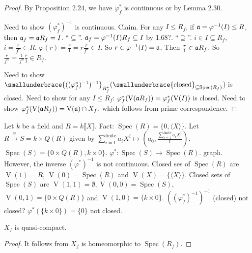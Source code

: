 \begin{proof}
    By Proposition 2.24, we have $\varphi_f^*$ is continuous or by Lemma 2.30. \par 
    Need to show $(\varphi_f^*)^{-1}$ is continuous. Claim. For any $I \leq R_f$, if $\mathfrak{a} = \varphi^{-1}(I) \leq R$, then $\mathfrak{a}_f = \mathfrak{a} R_f = I$. ``$\subseteq$''. $\mathfrak{a}_f = \varphi^{-1}(I)R_f \subseteq I$ by 1.68?. ``$\supseteq$''. $i \in I \subseteq R_f$, $i = \frac{r}{f^n} \in R$. $\varphi(r) = \frac{r}{1} = r\frac{r}{f^n} \in I $. So $r \in \varphi^{-1}(I) = \mathfrak{a}$. Then $\frac{r}{1} \in \mathfrak{a} R_f$. So $\frac{r}{f^n} = \frac{1}{f^n} \frac{r}{1} \in R_f$. \par 
    Need to show $\smallunderbrace{((\varphi_f^*)^{-1})^{-1}}_{R_f^*}(\smallunderbrace{\text{closed}}_{\subseteq \operatorname{Spec}(R_f)}$) is closed. Need to show for any $I \leq R_f$: $\varphi_f^*(\operatorname{V}(\mathfrak{a} R_f)) = \varphi_f^*(\operatorname{V}(I))$ is closed. Need to show $\varphi_f^*(\operatorname{V}(\mathfrak{a} R_f)) = \operatorname{V}(\mathfrak{a}) \cap X_f$, which follows from prime correspondence.
\end{proof}

\begin{example}
    Let $k$ be a field and $R = k\llbracket X \rrbracket$. Fact: $\operatorname{Spec}(R) = \{0,\langle X \rangle\}$. Let $R \xrightarrow \varphi S = k \times Q(R)$ given by $\sum_{i=1}^{\text{finite}} a_iX^i \mapsto (a_0,\frac{\sum_{i=1}^{\text{finite}} a_iX^i}{1})$. $\operatorname{Spec}(S) = \{0 \times Q(R), k \times 0\}$. $\varphi^*: \operatorname{Spec}(S) \to \operatorname{Spec}(R)$. graph. However, the inverse $(\varphi^*)^{-1}$ is not continuous. Closed ses of $\operatorname{Spec}(R)$ are $\operatorname{V}(1) = R$, $\operatorname{V}(0) = \operatorname{Spec}(R)$ and $\operatorname{V}(X) = \{\langle X \rangle\}$. Closed sets of $\operatorname{Spec}(S)$ are $\operatorname{V}(1,1) = \emptyset, \operatorname{V}(0,0) = \operatorname{Spec}(S)$, $\operatorname{V}(0,1) = \{0 \times Q(R)\}$ and $\operatorname{V}(1,0) = \{k \times 0\}$. $((\varphi_f^*)^{-1})^{-1}$ (closed) not closed? $\varphi^*(\{k \times 0\}) = \{0\}$ not closed.
\end{example}

\begin{corollary}
    $X_f$ is quasi-compact.
\end{corollary}

\begin{proof}
    It follows from $X_f$ is homeomorphic to $\operatorname{Spec}(R_f)$.
\end{proof}


